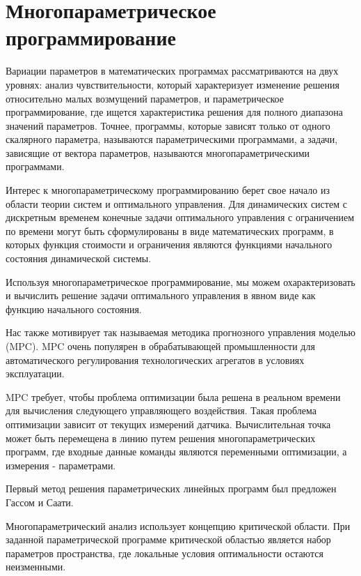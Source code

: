 \section{Многопараметрическое программирование}\label{2sec:gabella}

Вариации параметров в математических программах рассматриваются на двух уровнях: анализ чувствительности, который характеризует изменение решения относительно малых возмущений параметров, и параметрическое программирование, где ищется характеристика решения для полного диапазона значений параметров. Точнее, программы, которые зависят только от одного скалярного параметра, называются параметрическими программами, а задачи, зависящие от вектора параметров, называются многопараметрическими программами.

Интерес к многопараметрическому программированию берет свое начало из области теории систем и оптимального управления. Для динамических систем с дискретным временем конечные задачи оптимального управления с ограничением по времени могут быть сформулированы в виде математических программ, в которых функция стоимости и ограничения являются функциями начального состояния динамической системы.

Используя многопараметрическое программирование, мы можем охарактеризовать и вычислить решение задачи оптимального управления в явном виде как функцию начального состояния.

Нас также мотивирует так называемая методика прогнозного управления моделью (MPC). MPC очень популярен в обрабатывающей промышленности для автоматического регулирования технологических агрегатов в условиях эксплуатации.

MPC требует, чтобы проблема оптимизации была решена в реальном времени для вычисления следующего управляющего воздействия. Такая проблема оптимизации зависит от текущих измерений датчика. Вычислительная точка может быть перемещена в линию путем решения многопараметрических программ, где входные данные команды являются переменными оптимизации, а измерения - параметрами.

Первый метод решения параметрических линейных программ был предложен Гассом и Саати.


Многопараметрический анализ использует концепцию критической области. При заданной параметрической программе критической областью является набор параметров пространства, где локальные условия оптимальности остаются неизменными.


